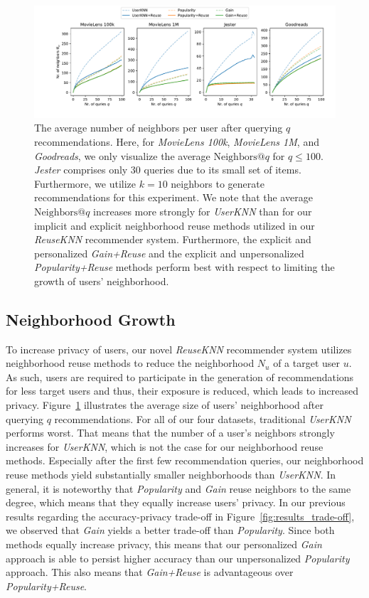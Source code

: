 \documentclass[manuscript,review,anonymous]{acmart}
\begin{document}
\begin{figure}[!t]
    \centering
    \includegraphics[width=\linewidth]{figures/neighborhood.pdf}
    \caption{The average number of neighbors per user after querying $q$ recommendations. Here, for \emph{MovieLens 100k}, \emph{MovieLens 1M}, and \emph{Goodreads}, we only visualize the average $\mathrm{Neighbors}@q$ for $q \leq 100$.
    \emph{Jester} comprises only 30 queries due to its small set of items. 
    Furthermore, we utilize $k=10$ neighbors to generate recommendations for this experiment. 
    We note that the average $\mathrm{Neighbors}@q$ increases more strongly for \emph{UserKNN} than for our implicit and explicit neighborhood reuse methods utilized in our \emph{ReuseKNN} recommender system. Furthermore, the explicit and personalized \emph{Gain+Reuse} and the explicit and unpersonalized \emph{Popularity+Reuse} methods perform best with respect to limiting the growth of users' neighborhood.}
    \label{fig:results_neighborhood}
\end{figure}

\subsection{Neighborhood Growth}
To increase privacy of users, our novel \emph{ReuseKNN} recommender system utilizes neighborhood reuse methods to reduce the neighborhood $N_u$ of a target user $u$.
As such, users are required to participate in the generation of recommendations for less target users and thus, their exposure is reduced, which leads to increased privacy.
Figure~\ref{fig:results_neighborhood} illustrates the average size of users' neighborhood after querying $q$ recommendations. 
For all of our four datasets, traditional \emph{UserKNN} performs worst.
That means that the number of a user's neighbors strongly increases for \emph{UserKNN}, which is not the case for our neighborhood reuse methods.
Especially after the first few recommendation queries, our neighborhood reuse methods yield substantially smaller neighborhoods than \emph{UserKNN}.
In general, it is noteworthy that \emph{Popularity} and \emph{Gain} reuse neighbors to the same degree, which means that they equally increase users' privacy.
In our previous results regarding the accuracy-privacy trade-off in Figure~\ref{fig:results_trade-off}, we observed that \emph{Gain} yields a better trade-off than \emph{Popularity}.
Since both methods equally increase privacy, this means that our personalized \emph{Gain} approach is able to persist higher accuracy than our unpersonalized \emph{Popularity} approach.
This also means that \emph{Gain+Reuse} is advantageous over \emph{Popularity+Reuse}.
\end{document}
